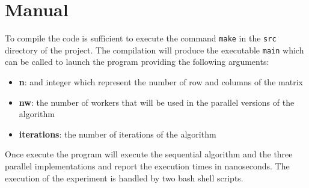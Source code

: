 \documentclass{article}
\begin{document}
	
	\section{Manual}
	To compile the code is sufficient to execute the command \verb*|make| in the \verb*|src| directory of the project. The compilation will produce the executable \verb*|main| which can be called to launch the program providing the following arguments:
	\begin{itemize}
		\item \textbf{n}: and integer which represent the number of row and columns of the matrix
		\item \textbf{nw}: the number of workers that will be used in the parallel versions of the algorithm
		\item \textbf{iterations}: the number of iterations of the algorithm
	\end{itemize} 
	Once execute the program will execute the sequential algorithm and the three parallel implementations and report the execution times in nanoseconds. The execution of the experiment is handled by two bash shell scripts.
\end{document}
